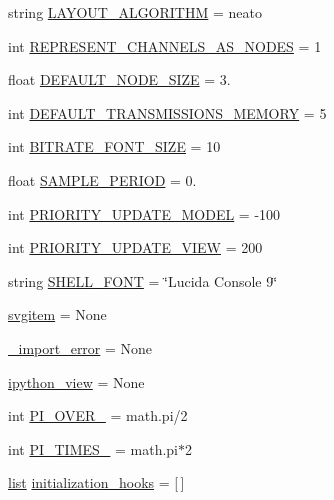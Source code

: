 \begin{DoxyCompactItemize}
\item 
string \hyperlink{namespacevisualizer_1_1core_a209782f88554fc65d8717ef6646a4eae}{L\+A\+Y\+O\+U\+T\+\_\+\+A\+L\+G\+O\+R\+I\+T\+HM} = \textquotesingle{}neato\textquotesingle{}
\item 
int \hyperlink{namespacevisualizer_1_1core_a54f19b9a7e648bd627e24d385cd73cc5}{R\+E\+P\+R\+E\+S\+E\+N\+T\+\_\+\+C\+H\+A\+N\+N\+E\+L\+S\+\_\+\+A\+S\+\_\+\+N\+O\+D\+ES} = 1
\item 
float \hyperlink{namespacevisualizer_1_1core_ad1fcd0cb3f506fa9a098f954808796be}{D\+E\+F\+A\+U\+L\+T\+\_\+\+N\+O\+D\+E\+\_\+\+S\+I\+ZE} = 3.
\item 
int \hyperlink{namespacevisualizer_1_1core_a7ecf84e04c2a2e59ee22d7ab252bc62c}{D\+E\+F\+A\+U\+L\+T\+\_\+\+T\+R\+A\+N\+S\+M\+I\+S\+S\+I\+O\+N\+S\+\_\+\+M\+E\+M\+O\+RY} = 5
\item 
int \hyperlink{namespacevisualizer_1_1core_af6240d12b06e79e344360298c852502f}{B\+I\+T\+R\+A\+T\+E\+\_\+\+F\+O\+N\+T\+\_\+\+S\+I\+ZE} = 10
\item 
float \hyperlink{namespacevisualizer_1_1core_a9f6932a07a73d9e64181d8028404c467}{S\+A\+M\+P\+L\+E\+\_\+\+P\+E\+R\+I\+OD} = 0.
\item 
int \hyperlink{namespacevisualizer_1_1core_a1d2cb0b45e99227b9e3480d06b754559}{P\+R\+I\+O\+R\+I\+T\+Y\+\_\+\+U\+P\+D\+A\+T\+E\+\_\+\+M\+O\+D\+EL} = -\/100
\item 
int \hyperlink{namespacevisualizer_1_1core_ac3b40d3d8d8cc973793368b051bd1bec}{P\+R\+I\+O\+R\+I\+T\+Y\+\_\+\+U\+P\+D\+A\+T\+E\+\_\+\+V\+I\+EW} = 200
\item 
string \hyperlink{namespacevisualizer_1_1core_affae76db4ec5f24f0a6fe88db03b550f}{S\+H\+E\+L\+L\+\_\+\+F\+O\+NT} = \char`\"{}Lucida Console 9\char`\"{}
\item 
\hyperlink{namespacevisualizer_1_1core_a5174fcd2345eba943e1e702c9ccfd0b4}{svgitem} = None
\item 
\hyperlink{namespacevisualizer_1_1core_a5f0889b74a24056b3c146086040ceb8f}{\+\_\+import\+\_\+error} = None
\item 
\hyperlink{namespacevisualizer_1_1core_acf2f72853208fea0b261bd2df46bc21e}{ipython\+\_\+view} = None
\item 
int \hyperlink{namespacevisualizer_1_1core_aee12c049cc9598f58729ee3c2d9efc56}{P\+I\+\_\+\+O\+V\+E\+R\+\_} = math.\+pi/2
\item 
int \hyperlink{namespacevisualizer_1_1core_aa8aba44ab0516e7fde8cf635c72f5331}{P\+I\+\_\+\+T\+I\+M\+E\+S\+\_} = math.\+pi$\ast$2
\item 
\hyperlink{openflow-interface_8h_afd9bcfa176617760671b67580f536fa7}{list} \hyperlink{namespacevisualizer_1_1core_aa9172d6011d4bf4ad612f8a6a9314527}{initialization\+\_\+hooks} = \mbox{[}$\,$\mbox{]}
\end{DoxyCompactItemize}


